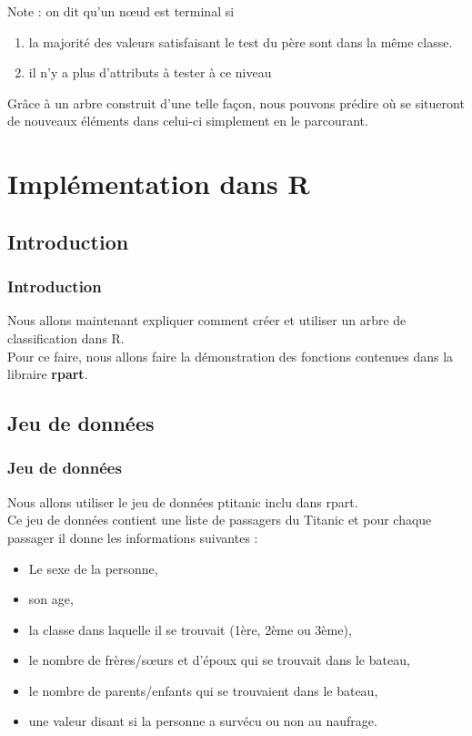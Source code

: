 \documentclass[compress]{beamer}
\begin{document}
\begin{frame}
Note : on dit qu'un nœud est terminal si 
\begin{enumerate}
\item la majorité des valeurs satisfaisant le test du père sont dans la même classe.
\item il n'y a plus d'attributs à tester à ce niveau
\end{enumerate}

Grâce à un arbre construit d'une telle façon, nous pouvons prédire où se situeront de nouveaux éléments dans celui-ci simplement en le parcourant.
\end{frame}

\section{Implémentation dans R}
\subsection{Introduction}
\begin{frame}
\frametitle{Introduction}
Nous allons maintenant expliquer comment créer et utiliser un arbre de classification dans R.\\
Pour ce faire, nous allons faire la démonstration des fonctions contenues dans la libraire \textbf{rpart}.
\end{frame}
\subsection{Jeu de données}
\begin{frame}
\frametitle{Jeu de données}
Nous allons utiliser le jeu de données \textrm{ptitanic} inclu dans \textrm{rpart}.\\
Ce jeu de données contient une liste de passagers du Titanic et pour chaque passager il donne les informations suivantes :\newline
\begin{itemize}
 \item Le sexe de la personne,
 \item son age,
 \item la classe dans laquelle il se trouvait (1ère, 2ème ou 3ème),
 \item le nombre de frères/sœurs et d'époux qui se trouvait dans le bateau,
 \item le nombre de parents/enfants qui se trouvaient dans le bateau,
 \item une valeur disant si la personne a survécu ou non au naufrage.
\end{itemize}
\end{frame}
\end{document}
